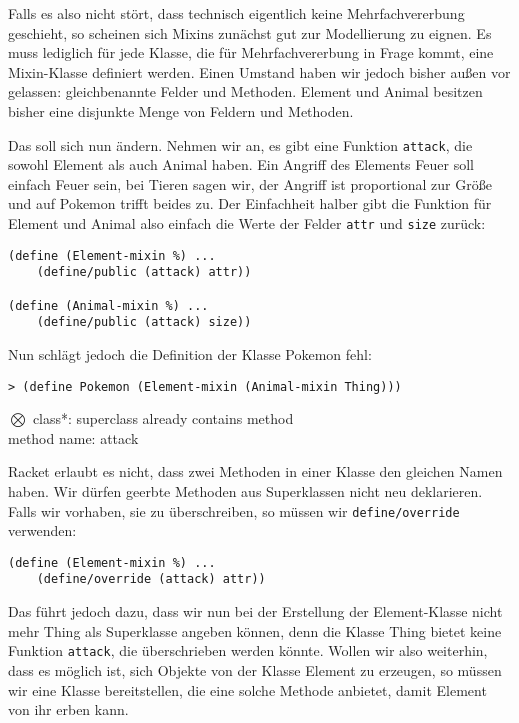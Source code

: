 Falls es also nicht stört, dass technisch eigentlich keine Mehrfachvererbung geschieht, so scheinen sich Mixins zunächst gut zur Modellierung zu eignen. Es muss lediglich für jede Klasse, die für Mehrfachvererbung in Frage kommt, eine Mixin-Klasse definiert werden. Einen Umstand haben wir jedoch bisher außen vor gelassen: gleichbenannte Felder und Methoden. Element und Animal besitzen bisher eine disjunkte Menge von Feldern und Methoden. 

Das soll sich nun ändern. Nehmen wir an, es gibt eine Funktion \texttt{attack}, die sowohl Element als auch Animal haben. Ein Angriff des Elements Feuer soll einfach Feuer sein, bei Tieren sagen wir, der Angriff ist proportional zur Größe und auf Pokemon trifft beides zu. Der Einfachheit halber gibt die Funktion für Element und Animal also einfach die Werte der Felder \texttt{attr} und \texttt{size} zurück:

\begin{lstlisting}
(define (Element-mixin %) ...
    (define/public (attack) attr))
 
(define (Animal-mixin %) ...
    (define/public (attack) size))
\end{lstlisting}

Nun schlägt jedoch die Definition der Klasse Pokemon fehl:

\begin{lstlisting}
> (define Pokemon (Element-mixin (Animal-mixin Thing)))
\end{lstlisting}
{\rerror $\bigotimes$ class*: superclass already contains method\\
method name: attack}

Racket erlaubt es nicht, dass zwei Methoden in einer Klasse den gleichen Namen haben. Wir dürfen geerbte Methoden aus Superklassen nicht neu deklarieren. Falls wir vorhaben, sie zu überschreiben, so müssen wir \texttt{define/override} verwenden:

\begin{lstlisting}
(define (Element-mixin %) ...
    (define/override (attack) attr))
\end{lstlisting}

Das führt jedoch dazu, dass wir nun bei der Erstellung der Element-Klasse nicht mehr Thing als Superklasse angeben können, denn die Klasse Thing bietet keine Funktion \texttt{attack}, die überschrieben werden könnte. Wollen wir also weiterhin, dass es möglich ist, sich Objekte von der Klasse Element zu erzeugen, so müssen wir eine Klasse bereitstellen, die eine solche Methode anbietet, damit Element von ihr erben kann.

